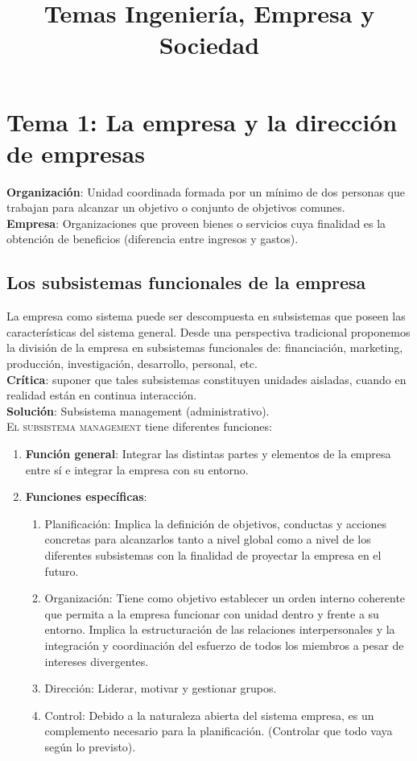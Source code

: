 \documentclass[12pt]{article}
\title{Temas Ingeniería, Empresa y Sociedad}
\author{ }
\theoremstyle{definition_wo_parentheses}
\begin{document}
\maketitle

\section{Tema 1: La empresa y la dirección de empresas}
\textbf{Organización}: Unidad coordinada formada por un mínimo de dos personas que trabajan para alcanzar un objetivo o conjunto de objetivos comunes.\\
\textbf{Empresa}: Organizaciones que proveen bienes o servicios cuya finalidad es la obtención de beneficios (diferencia entre ingresos y gastos).\\

\subsection{Los subsistemas funcionales de la empresa}
La empresa como sistema puede ser descompuesta en subsistemas que poseen las características del sistema general. Desde una perspectiva tradicional proponemos la división de la empresa en subsistemas funcionales de: financiación, marketing, producción, investigación, desarrollo, personal, etc.\\
\textbf{Crítica}: suponer que tales subsistemas constituyen unidades aisladas, cuando en realidad están en continua interacción.\\
\textbf{Solución}: Subsistema management (administrativo).\\

\textsc{El subsistema management} tiene diferentes funciones:
\begin{enumerate}
\item \textbf{Función general}: Integrar las distintas partes y elementos de la empresa entre sí e integrar la empresa con su entorno.
\item \textbf{Funciones específicas}: 
\begin{enumerate}
\item Planificación: Implica la definición de objetivos, conductas y acciones concretas para alcanzarlos tanto a nivel global como a nivel de los diferentes subsistemas con la finalidad de proyectar la empresa en el futuro.
\item Organización: Tiene como objetivo establecer un orden interno coherente que permita a la empresa funcionar con unidad dentro y frente a su entorno. Implica la estructuración de las relaciones interpersonales y la integración y coordinación del esfuerzo de todos los miembros a pesar de intereses divergentes.
\item Dirección: Liderar, motivar y gestionar grupos.
\item Control: Debido a la naturaleza abierta del sistema empresa, es un complemento necesario para la planificación. (Controlar que todo vaya según lo previsto).
\end{enumerate}
\end{enumerate}
\end{document}
